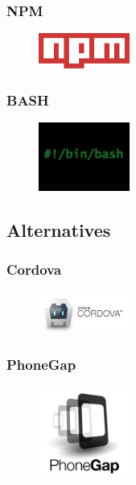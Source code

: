 \subsubsection{NPM}
\begin{figure}
\includegraphics[width=3cm]{img/mobile-app/logos/npm.png}
\end{figure} 


\subsubsection{BASH}
\begin{figure}
\includegraphics[width=3cm]{img/mobile-app/logos/bash.jpg}
\end{figure} 

\subsection{Alternatives}
\subsubsection{Cordova}
\begin{figure}
\includegraphics[width=3cm]{img/mobile-app/logos/cordova.jpg}
\end{figure} 

\subsubsection{PhoneGap}
\begin{figure}
\includegraphics[width=3cm]{img/mobile-app/logos/PhoneGap.png}
\end{figure} 

